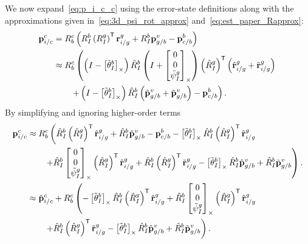 We now expand~\eqref{eq:p_i_c_c} using the error-state definitions along with
the approximations given in~\eqref{eq:3d_psi_rot_approx}
and~\eqref{eq:est_paper_Rapprox}:
\begin{align}
  \mathrm{\mathbf{p}}_{i/c}^c &= R_b^c \left( R_I^b \left( R_I^g \right)^{\mathsf{T}}
  \mathrm{\mathbf{r}}_{i/g}^g + R_I^b \mathrm{\mathbf{p}}_{g/b}^v - \mathrm{\mathbf{p}}_{c/b}^b \right) \\
  &\approx R_b^c \left( \left( I - \left[ \tilde{\mathrm{\mathbf{\theta}}}_I^b
     \right]_{\times} \right) \hat{R}_I^b \left( I +
    \left[  \begin{matrix} 0 \\ 0 \\ \tilde{\psi}_I^g \end{matrix}  \right]_{\times}
  \right) \left( \hat{R}_I^g \right)^{\mathsf{T}}
  \left( \hat{\mathrm{\mathbf{r}}}_{i/g}^g + \tilde{\mathrm{\mathbf{r}}}_{i/g}^g \right) \right. \\
  & \qquad \left. + \left( I -
  \left[ \tilde{\mathrm{\mathbf{\theta}}}_I^b \right]_{\times} \right) \hat{R}_I^b
  \left( \hat{\mathrm{\mathbf{p}}}_{g/b}^v + \tilde{\mathrm{\mathbf{p}}}_{g/b}^v \right) -
  \mathrm{\mathbf{p}}_{c/b}^b \right). \nonumber \\
\end{align}
By simplifying and ignoring higher-order terms
\begin{align}
  \mathrm{\mathbf{p}}_{i/c}^c 
  &\approx R_b^c \left( \hat{R}_I^b \left( \hat{R}_I^g \right)^{\mathsf{T}}
  \hat{\mathrm{\mathbf{r}}}_{i/g}^g + \hat{R}_I^b \hat{\mathrm{\mathbf{p}}}_{g/b}^v - \mathrm{\mathbf{p}}_{c/b}^b
  - \left[ \tilde{\mathrm{\mathbf{\theta}}}_I^b \right]_{\times} \hat{R}_I^b \left( \hat{R}_I^g
    \right)^{\mathsf{T}} \hat{\mathrm{\mathbf{r}}}_{i/g}^g \right. \\
  & \qquad \left. + \hat{R}_I^b
    \left[ \begin{matrix} 0 \\ 0 \\ \tilde{\psi}_I^g \end{matrix} \right]_{\times} \left( \hat{R}_I^g
  \right)^{\mathsf{T}} \hat{\mathrm{\mathbf{r}}}_{i/g}^g +
\hat{R}_I^b \left( \hat{R}_I^g
    \right)^{\mathsf{T}} \tilde{\mathrm{\mathbf{r}}}_{i/g}^g
    - \left[ \tilde{\mathrm{\mathbf{\theta}}}_I^b \right]_{\times} \hat{R}_I^b \hat{\mathrm{\mathbf{p}}}_{g/b}^v
    + \hat{R}_I^b \tilde{\mathrm{\mathbf{p}}}_{g/b}^v
   \right). \nonumber \\
    &\approx \hat{\mathrm{\mathbf{p}}}_{i/c}^c
    + R_b^c \left( 
  - \left[ \tilde{\mathrm{\mathbf{\theta}}}_I^b \right]_{\times} \hat{R}_I^b \left( \hat{R}_I^g
    \right)^{\mathsf{T}} \hat{\mathrm{\mathbf{r}}}_{i/g}^g + \hat{R}_I^b
    \left[ \begin{matrix} 0 \\ 0 \\ \tilde{\psi}_I^g \end{matrix} \right]_{\times} \left( \hat{R}_I^g
  \right)^{\mathsf{T}} \hat{\mathrm{\mathbf{r}}}_{i/g}^g \right. \label{eq:p_i_c_c_simplified} \\
    & \qquad \left. +
\hat{R}_I^b \left( \hat{R}_I^g
    \right)^{\mathsf{T}} \tilde{\mathrm{\mathbf{r}}}_{i/g}^g
                   - \left[ \tilde{\mathrm{\mathbf{\theta}}}_I^b \right]_{\times} \hat{R}_I^b \hat{\mathrm{\mathbf{p}}}_{g/b}^v
    + \hat{R}_I^b \tilde{\mathrm{\mathbf{p}}}_{g/b}^v
   \right) \nonumber. 
\end{align}

